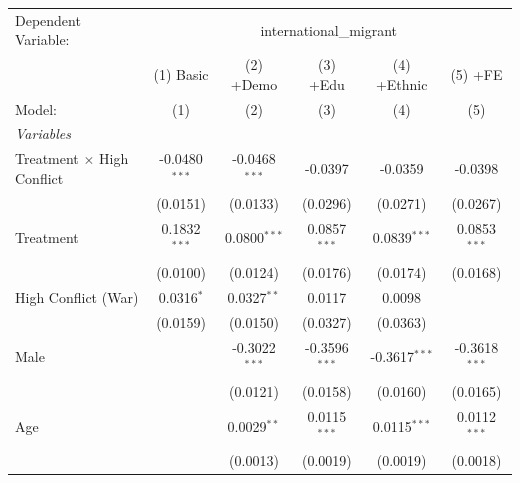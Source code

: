 
\begingroup
\centering
\begin{tabular}{lccccc}
   \tabularnewline \midrule \midrule
   Dependent Variable: & \multicolumn{5}{c}{international\_migrant}\\
                                     & (1) Basic       & (2) +Demo                      & (3) +Edu                & (4) +Ethnic             & (5) +FE \\   
   Model:                            & (1)             & (2)                            & (3)                     & (4)                     & (5)\\  
   \midrule
   \emph{Variables}\\
   Treatment $\times$ High Conflict  & -0.0480$^{***}$ & -0.0468$^{***}$                & -0.0397                 & -0.0359                 & -0.0398\\   
                                     & (0.0151)        & (0.0133)                       & (0.0296)                & (0.0271)                & (0.0267)\\   
   Treatment                         & 0.1832$^{***}$  & 0.0800$^{***}$                 & 0.0857$^{***}$          & 0.0839$^{***}$          & 0.0853$^{***}$\\   
                                     & (0.0100)        & (0.0124)                       & (0.0176)                & (0.0174)                & (0.0168)\\   
   High Conflict (War)               & 0.0316$^{*}$    & 0.0327$^{**}$                  & 0.0117                  & 0.0098                  &   \\   
                                     & (0.0159)        & (0.0150)                       & (0.0327)                & (0.0363)                &   \\   
   Male                              &                 & -0.3022$^{***}$                & -0.3596$^{***}$         & -0.3617$^{***}$         & -0.3618$^{***}$\\   
                                     &                 & (0.0121)                       & (0.0158)                & (0.0160)                & (0.0165)\\   
   Age                               &                 & 0.0029$^{**}$                  & 0.0115$^{***}$          & 0.0115$^{***}$          & 0.0112$^{***}$\\   
                                     &                 & (0.0013)                       & (0.0019)                & (0.0019)                & (0.0018)\\   

\end{tabular}

